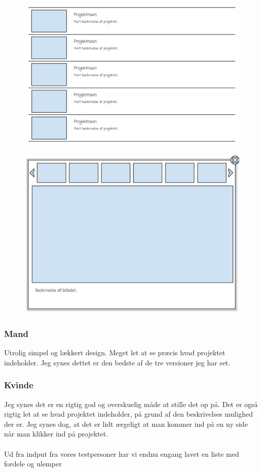 \documentclass[a4paper,titlepage,fleqn,12pt]{article}
\begin{document}
\begin{figure}[H]
	\includegraphics[width=\textwidth]{Sketch2_1.png}
\end{figure}

\begin{figure}[H]
	\includegraphics[width=\textwidth]{Sketch2_2.png}
\end{figure}

\subsubsection*{Mand}
Utrolig simpel og lækkert design. Meget let at se præcis hvad projektet indeholder. Jeg synes dettet er den bedste af de tre versioner jeg har set. 

\subsubsection*{Kvinde}
Jeg synes det er en rigtig god og overskuelig måde at stille det op på. Det er også rigtig let at se hvad projektet indeholder, på grund af den beskrivelses mulighed der er. Jeg synes dog, at det er lidt ærgeligt at man kommer ind på en ny side når man klikker ind på projektet.\\\\
Ud fra indput fra vores testpersoner har vi endnu engang lavet en liste med fordele og ulemper
\end{document}
